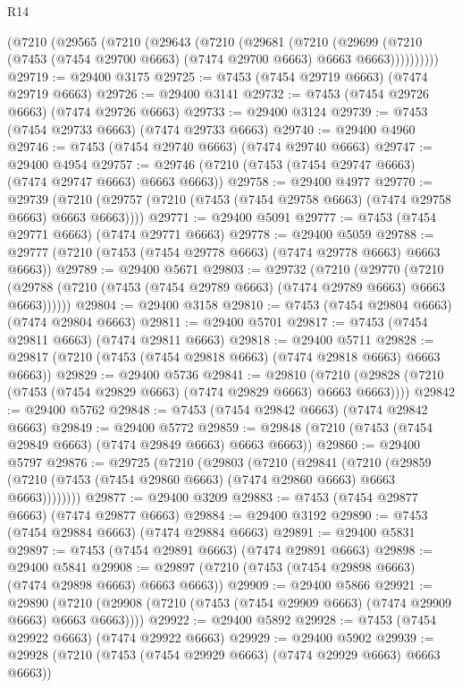 \begin{lexlean}{R14}
\begin{coremodule}
    (@7210
      (@29565
        (@7210
          (@29643
            (@7210
              (@29681
                (@7210
                  (@29699
                    (@7210 (@7453 (@7454 @29700 @6663) (@7474 @29700 @6663) @6663 @6663))))))))))
@29719 := @29400 @3175
@29725 := @7453 (@7454 @29719 @6663) (@7474 @29719 @6663)
@29726 := @29400 @3141
@29732 := @7453 (@7454 @29726 @6663) (@7474 @29726 @6663)
@29733 := @29400 @3124
@29739 := @7453 (@7454 @29733 @6663) (@7474 @29733 @6663)
@29740 := @29400 @4960
@29746 := @7453 (@7454 @29740 @6663) (@7474 @29740 @6663)
@29747 := @29400 @4954
@29757 := @29746 (@7210 (@7453 (@7454 @29747 @6663) (@7474 @29747 @6663) @6663 @6663))
@29758 := @29400 @4977
@29770 := @29739
    (@7210 (@29757 (@7210 (@7453 (@7454 @29758 @6663) (@7474 @29758 @6663) @6663 @6663))))
@29771 := @29400 @5091
@29777 := @7453 (@7454 @29771 @6663) (@7474 @29771 @6663)
@29778 := @29400 @5059
@29788 := @29777 (@7210 (@7453 (@7454 @29778 @6663) (@7474 @29778 @6663) @6663 @6663))
@29789 := @29400 @5671
@29803 := @29732
    (@7210
      (@29770
        (@7210 (@29788 (@7210 (@7453 (@7454 @29789 @6663) (@7474 @29789 @6663) @6663 @6663))))))
@29804 := @29400 @3158
@29810 := @7453 (@7454 @29804 @6663) (@7474 @29804 @6663)
@29811 := @29400 @5701
@29817 := @7453 (@7454 @29811 @6663) (@7474 @29811 @6663)
@29818 := @29400 @5711
@29828 := @29817 (@7210 (@7453 (@7454 @29818 @6663) (@7474 @29818 @6663) @6663 @6663))
@29829 := @29400 @5736
@29841 := @29810
    (@7210 (@29828 (@7210 (@7453 (@7454 @29829 @6663) (@7474 @29829 @6663) @6663 @6663))))
@29842 := @29400 @5762
@29848 := @7453 (@7454 @29842 @6663) (@7474 @29842 @6663)
@29849 := @29400 @5772
@29859 := @29848 (@7210 (@7453 (@7454 @29849 @6663) (@7474 @29849 @6663) @6663 @6663))
@29860 := @29400 @5797
@29876 := @29725
    (@7210
      (@29803
        (@7210
          (@29841
            (@7210
              (@29859 (@7210 (@7453 (@7454 @29860 @6663) (@7474 @29860 @6663) @6663 @6663))))))))
@29877 := @29400 @3209
@29883 := @7453 (@7454 @29877 @6663) (@7474 @29877 @6663)
@29884 := @29400 @3192
@29890 := @7453 (@7454 @29884 @6663) (@7474 @29884 @6663)
@29891 := @29400 @5831
@29897 := @7453 (@7454 @29891 @6663) (@7474 @29891 @6663)
@29898 := @29400 @5841
@29908 := @29897 (@7210 (@7453 (@7454 @29898 @6663) (@7474 @29898 @6663) @6663 @6663))
@29909 := @29400 @5866
@29921 := @29890
    (@7210 (@29908 (@7210 (@7453 (@7454 @29909 @6663) (@7474 @29909 @6663) @6663 @6663))))
@29922 := @29400 @5892
@29928 := @7453 (@7454 @29922 @6663) (@7474 @29922 @6663)
@29929 := @29400 @5902
@29939 := @29928 (@7210 (@7453 (@7454 @29929 @6663) (@7474 @29929 @6663) @6663 @6663))

\end{coremodule}
\end{lexlean}
